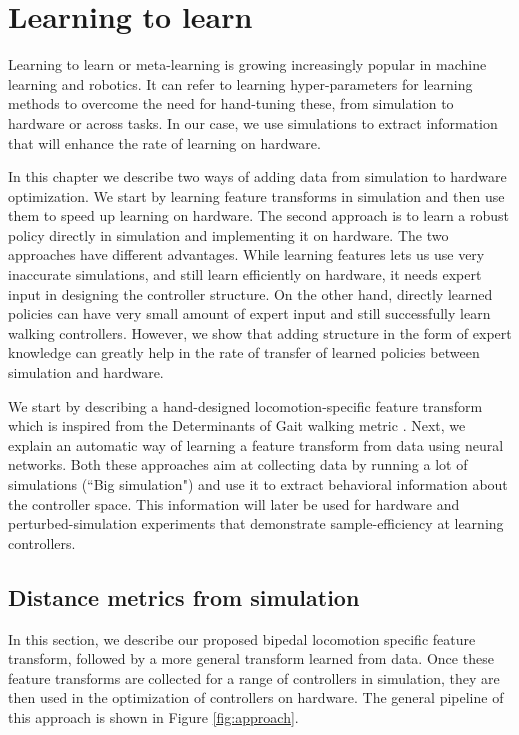 \chapter{Learning to learn}
\label{chap:learn}

Learning to learn or meta-learning is growing increasingly popular in machine learning and robotics. It can refer to learning hyper-parameters for learning methods to overcome the need for hand-tuning these, from simulation to hardware or across tasks. In our case, we use simulations to extract information that will enhance the rate of learning on hardware. 

In this chapter we describe two ways of adding data from simulation to hardware optimization. We start by learning feature transforms in simulation and then use them to speed up learning on hardware. The second approach is to learn a robust policy directly in simulation and implementing it on hardware. The two approaches have different advantages. While learning features lets us use very inaccurate simulations, and still learn efficiently on hardware, it needs expert input in designing the controller structure. On the other hand, directly learned policies can have very small amount of expert input and still successfully learn walking controllers. However, we show that adding structure in the form of expert knowledge can greatly help in the rate of transfer of learned policies between simulation and hardware.

We start by describing a hand-designed locomotion-specific feature transform which is inspired from the Determinants of Gait walking metric \citep{inman1953major}. Next, we explain an automatic way of learning a feature transform from data using neural networks. Both these approaches aim at collecting data by running a lot of simulations (``Big simulation") and use it to extract behavioral information about the controller space. This information will later be used for hardware and perturbed-simulation experiments that demonstrate sample-efficiency at learning controllers.

\section{Distance metrics from simulation}
In this section, we describe our proposed bipedal locomotion specific feature transform, followed by a more general transform learned from data. Once these feature transforms are collected for a range of controllers in simulation, they are then used in the optimization of controllers on hardware. The general pipeline of this approach is shown in Figure \ref{fig:approach}.

